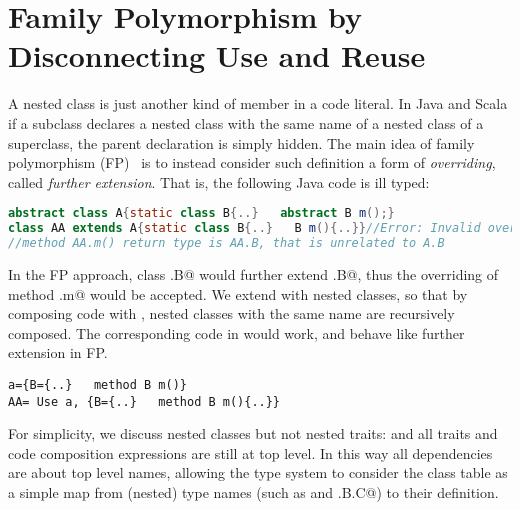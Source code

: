\section{Family
Polymorphism by Disconnecting Use and Reuse}

A nested class is just another kind of member in a code literal.
In Java and Scala if a subclass declares a nested class with the same
name of a nested class of a superclass, the parent declaration is simply hidden.
The main idea of family polymorphism (FP)~\cite{igarashi2005lightweight,IgarashiEtAl08,nystrom2006j,Ernst06,BruceEtAl98,IgarashiViroli07,deep}
is to instead consider such definition a form of \emph{overriding},
called \emph{further extension}.
That is, the following Java code is ill typed:
\begin{lstlisting}[language=Java]
abstract class A{static class B{..}   abstract B m();}
class AA extends A{static class B{..}   B m(){..}}//Error: Invalid overriding
//method AA.m() return type is AA.B, that is unrelated to A.B
\end{lstlisting}
In the FP approach, class \Q@AA.B@ would further extend \Q@A.B@, thus the overriding of method
\Q@A.m@ would be accepted.
We extend \name with nested classes, so that 
by composing code with \use,
nested classes with the same name are recursively composed.
The corresponding code in \name would work, and behave like further
extension in FP.
\begin{lstlisting}
a={B={..}   method B m()}
AA= Use a, {B={..}   method B m(){..}}
\end{lstlisting}
For simplicity, we discuss nested classes but not nested traits:
and all traits and code composition expressions are still at top level.
In this way all dependencies are about top level names, allowing the type system 
to consider the class table as a simple map from (nested) type names
(such as \Q@A@ and \Q@A.B.C@)
to their definition.



